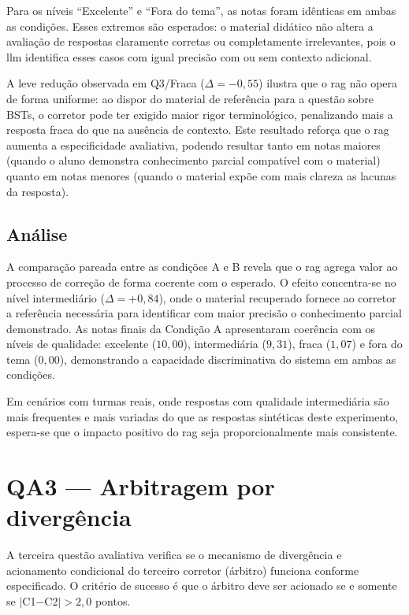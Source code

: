 Para os níveis ``Excelente'' e ``Fora do tema'', as notas foram idênticas em ambas as condições. Esses extremos são esperados: o material didático não altera a avaliação de respostas claramente corretas ou completamente irrelevantes, pois o \gls{llm} identifica esses casos com igual precisão com ou sem contexto adicional.

A leve redução observada em Q3/Fraca ($\Delta = -0{,}55$) ilustra que o \gls{rag} não opera de forma uniforme: ao dispor do material de referência para a questão sobre BSTs, o corretor pode ter exigido maior rigor terminológico, penalizando mais a resposta fraca do que na ausência de contexto. Este resultado reforça que o \gls{rag} aumenta a especificidade avaliativa, podendo resultar tanto em notas maiores (quando o aluno demonstra conhecimento parcial compatível com o material) quanto em notas menores (quando o material expõe com mais clareza as lacunas da resposta).

\subsection{Análise}

A comparação pareada entre as condições A e B revela que o \gls{rag} agrega valor ao processo de correção de forma coerente com o esperado. O efeito concentra-se no nível intermediário ($\Delta = +0{,}84$), onde o material recuperado fornece ao corretor a referência necessária para identificar com maior precisão o conhecimento parcial demonstrado. As notas finais da Condição A apresentaram coerência com os níveis de qualidade: excelente ($10{,}00$), intermediária ($9{,}31$), fraca ($1{,}07$) e fora do tema ($0{,}00$), demonstrando a capacidade discriminativa do sistema em ambas as condições.

Em cenários com turmas reais, onde respostas com qualidade intermediária são mais frequentes e mais variadas do que as respostas sintéticas deste experimento, espera-se que o impacto positivo do \gls{rag} seja proporcionalmente mais consistente.


\section{QA3 --- Arbitragem por divergência}
\label{sec:qa3}

A terceira questão avaliativa verifica se o mecanismo de divergência e acionamento condicional do terceiro corretor (árbitro) funciona conforme especificado. O critério de sucesso é que o árbitro deve ser acionado se e somente se $|$C1$-$C2$| > 2{,}0$ pontos.

